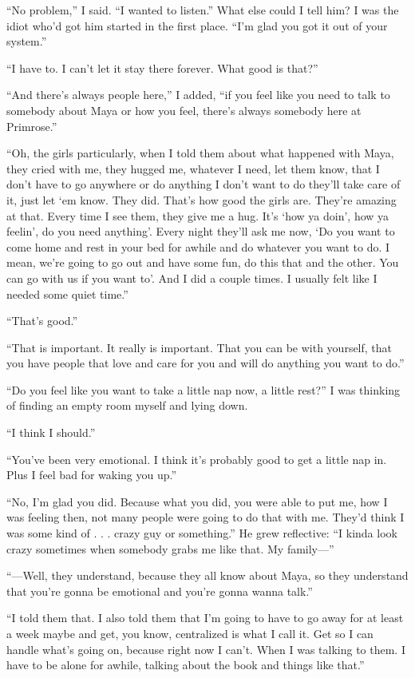 \documentclass[12pt]{book}
\begin{document}
``No problem,'' I said. ``I wanted to listen.'' What else could I tell him? I was the idiot who'd got him started in the first place. ``I'm glad you got it out of your system.''

``I have to. I can't let it stay there forever. What good is that?''

``And there's always people here,'' I added, ``if you feel like you need to talk to somebody about Maya or how you feel, there's always somebody here at Primrose.''

``Oh, the girls particularly, when I told them about what happened with Maya, they cried with me, they hugged me, whatever I need, let them know, that I don't have to go anywhere or do anything I don't want to do they'll take care of it, just let `em know. They did. That's how good the girls are. They're amazing at that. Every time I see them, they give me a hug. It's `how ya doin', how ya feelin', do you need anything'. Every night they'll ask me now, `Do you want to come home and rest in your bed for awhile and do whatever you want to do. I mean, we're going to go out and have some fun, do this that and the other. You can go with us if you want to'. And I did a couple times. I usually felt like I needed some quiet time.''

``That's good.''

``That is important. It really is important. That you can be with yourself, that you have people that love and care for you and will do anything you want to do.''

``Do you feel like you want to take a little nap now, a little rest?'' I was thinking of finding an empty room myself and lying down.

``I think I should.''

``You've been very emotional. I think it's probably good to get a little nap in. Plus I feel bad for waking you up.''

``No, I'm glad you did. Because what you did, you were able to put me, how I was feeling then, not many people were going to do that with me. They'd think I was some kind of . . . crazy guy or something.'' He grew reflective: ``I kinda look crazy sometimes when somebody grabs me like that. My family---''

``---Well, they understand, because they all know about Maya, so they understand that you're gonna be emotional and you're gonna wanna talk.''

``I told them that. I also told them that I'm going to have to go away for at least a week maybe and get, you know, centralized is what I call it. Get so I can handle what's going on, because right now I can't. When I was talking to them. I have to be alone for awhile, talking about the book and things like that.''
\end{document}
